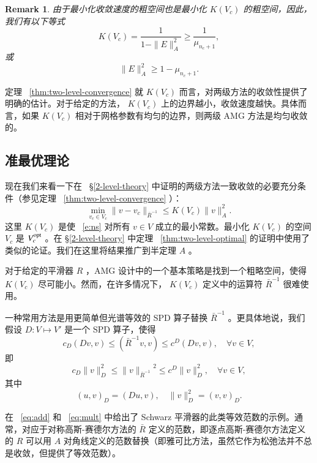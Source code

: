 \documentclass[12pt]{acta_2011xz}
\newcommand{\Tnorm}[1]{\ensuremath{\|#1\|_{\bar R^{-1}}}}
\newcommand{\Dscalar}[2]{\ensuremath{( #1 , #2 )_D}}
\newcommand{\Dnorm}[1]{\|#1\|_{D}}
\newtheorem{remark}[theorem]{Remark}
\begin{document}
   \begin{remark}由于最小化收敛速度的粗空间也是最小化    $K(V_c)$    的粗空间，因此，我们有以下等式
   \[
K(V_c) = \frac{1}{1-\|E\|_A^2} \ge \frac{1}{\mu_{n_c+1}},  
\]    或
   $$
\|E\|_A^2\ge 1-\mu_{n_c+1}. 
$$     \end{remark}     

定理~    \ref{thm:two-level-convergence}    就    $K(V_c)$    而言，对两级方法的收敛性提供了明确的估计。对于给定的方法，   $K(V_c)$    上的边界越小，收敛速度越快。具体而言，如果    $K(V_c)$    相对于网格参数有均匀的边界，则两级 AMG 方法是均匀收敛的。  

   \subsection{准最优理论  }       \label{s:semidefinite-theory}    现在我们来看一下在~    \S       \ref{2-level-theory}    中证明的两级方法一致收敛的必要充分条件（参见定理~    \ref{thm:two-level-convergence}    ）：
   \begin{equation}\label{e:ns}
\min_{v_c\in V_c}\Tnorm{v-v_c}\le K(V_c)\|v\|_A^2. 
\end{equation}    这里    $K(V_c)$    是使~    \eqref{e:ns}    对所有    $v\in V$    成立的最小常数。最小化    $K(V_c)$    的空间    $V_c$    是
   $V_c^{\rm opt}$    。在    \S       \ref{2-level-theory}    中定理~    \ref{thm:two-level-optimal}    的证明中使用了类似的论证。我们在这里将结果推广到半定理    $A$    。  

对于给定的平滑器    $R$    ，AMG 设计中的一个基本策略是找到一个粗略空间，使得    $K(V_c)$    尽可能小。然而，在许多情况下，   $K(V_c)$    定义中的运算符    $\bar{R}^{-1}$    很难使用。  

一种常用方法是用更简单但光谱等效的 SPD 算子替换    $\bar{R}^{-1}$   。更具体地说，我们假设    $D: V\mapsto V'$    是一个 SPD 算子，使得
   \begin{equation}\label{star-equiv-Y} c_D(Dv,v) \le
(\bar{R}^{-1} v,v) \le c^D( D v,v ), \quad
\forall v\in V,
\end{equation}    即
   \begin{equation}\label{star-equiv-norms} c_D \Dnorm{v}^2\le
\Tnorm{v}^2 \le c^D\Dnorm{v}^2, \quad \forall v\in V,
\end{equation}    其中
   \[ \Dscalar{u}{v}=( Du,v), \quad \Dnorm{v}^2 =
\Dscalar{v}{v}.
\]     

在~    \eqref{eq:add}    和~    \eqref{eq:mult}    中给出了 Schwarz 平滑器的此类等效范数的示例。通常，对应于对称高斯-赛德尔方法的
   $\bar{R}$    定义的范数，即逐点高斯-赛德尔方法定义的    $R$    可以用    $A$    对角线定义的范数替换（即雅可比方法，虽然它作为松弛法并不总是收敛，但提供了等效范数）。  
\end{document}
